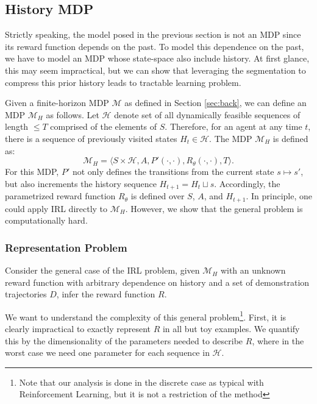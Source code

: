 \subsection{History MDP}
Strictly speaking, the model posed in the previous section is not an MDP since its reward function depends on the past.
To model this dependence on the past, we have to model an MDP whose state-space also include history.
At first glance, this may seem impractical, but we can show that leveraging the segmentation to compress this prior history leads to tractable learning problem.

Given a finite-horizon MDP $\mathcal{M}$ as defined in Section \ref{sec:back}, we can define an MDP $\mathcal{M}_H$ as follows.
Let $\mathcal{H}$ denote set of all dynamically feasible sequences of length $\le T$ comprised of the elements of $S$.
Therefore, for an agent at any time $t$, there is a sequence of previously visited states $H_t \in \mathcal{H}$.
The MDP $\mathcal{M}_H$ is defined as:
\[
\mathcal{M}_H = \langle S \times \mathcal{H},A,P'(\cdot,\cdot), R_\theta(\cdot,\cdot),T \rangle.
\]
For this MDP, $P'$ not only defines the transitions from the current state $s \mapsto s'$, but also increments the history sequence $H_{t+1} = H_{t} \sqcup s$.
Accordingly, the parametrized reward function $R_\theta$ is defined over $S$, $A$, and $H_{t+1}$.
In principle, one could apply IRL directly to $\mathcal{M}_H$.
However, we show that the general problem is computationally hard.

\vspace{0.5em}

\subsubsection{Representation Problem}
Consider the general case of the IRL problem, given $\mathcal{M}_H$ with an unknown reward function with arbitrary dependence on history and a set of demonstration trajectories $D$, infer the reward function $R$.

We want to understand the complexity of this general problem\footnote{Note that our analysis is done in the discrete case as typical with Reinforcement Learning,  but it is not a restriction of the method}.
First, it is clearly impractical to exactly represent $R$ in all but toy examples.
We quantify this by the dimensionality of the parameters needed to describe $R$, where in the worst case we need one parameter for each sequence in $\mathcal{H}$.

\vspace{0.5em}

